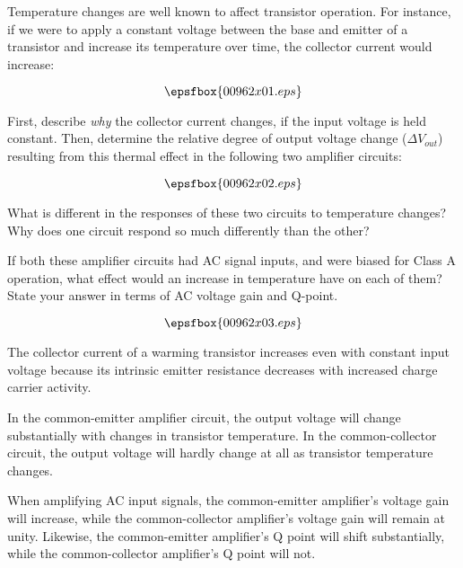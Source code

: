 

Temperature changes are well known to affect transistor operation.  For instance, if we were to apply a constant voltage between the base and emitter of a transistor and increase its temperature over time, the collector current would increase:

$$\epsfbox{00962x01.eps}$$

First, describe {\it why} the collector current changes, if the input voltage is held constant.  Then, determine the relative degree of output voltage change ($\Delta V_{out}$) resulting from this thermal effect in the following two amplifier circuits:

$$\epsfbox{00962x02.eps}$$

What is different in the responses of these two circuits to temperature changes?  Why does one circuit respond so much differently than the other?

If both these amplifier circuits had AC signal inputs, and were biased for Class A operation, what effect would an increase in temperature have on each of them?  State your answer in terms of AC voltage gain and Q-point.

$$\epsfbox{00962x03.eps}$$







The collector current of a warming transistor increases even with constant input voltage because its intrinsic emitter resistance decreases with increased charge carrier activity.

In the common-emitter amplifier circuit, the output voltage will change substantially with changes in transistor temperature.  In the common-collector circuit, the output voltage will hardly change at all as transistor temperature changes.  

When amplifying AC input signals, the common-emitter amplifier's voltage gain will increase, while the common-collector amplifier's voltage gain will remain at unity.  Likewise, the common-emitter amplifier's Q point will shift substantially, while the common-collector amplifier's Q point will not.







